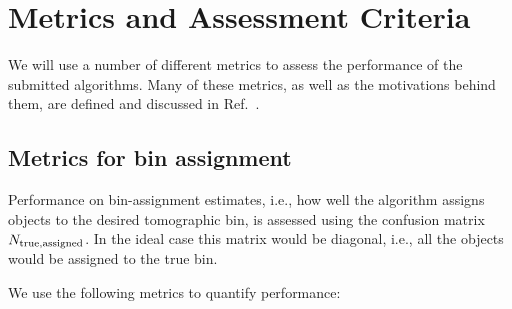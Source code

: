 \documentclass[11pt,twoside,letterpaper,onecolumn,english]{article}
\begin{document}
\section{Metrics and Assessment Criteria}
\label{sec:metrics}

We will use a number of different metrics to assess the performance of
the submitted algorithms. Many of these metrics, as well as the
motivations behind them, are defined and discussed in
Ref.~\cite{therailteam2025}.

\subsection{Metrics for bin assignment}

Performance on bin-assignment estimates, i.e., how well the algorithm
assigns objects to the desired tomographic bin, is assessed using the confusion
matrix $N_{\rm true, assigned}$.  In the ideal case this
matrix would be diagonal, i.e., all the objects would be assigned to the true bin.

We use the following metrics to quantify performance:
\end{document}
